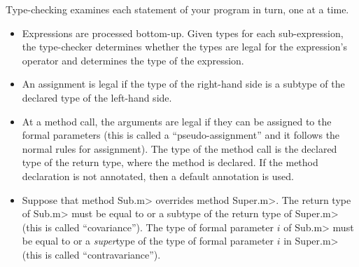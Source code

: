 Type-checking examines each statement of your program in turn, one at a time.
\begin{itemize}
\item
Expressions are processed bottom-up.  Given types for each sub-expression,
the type-checker determines whether the types are legal for the
expression's operator and determines the type of the expression.

\item
An assignment is legal if the type of the right-hand side is a subtype of
the declared type of the left-hand side.

\item
 At a method call, the arguments are legal if they can be assigned to the
 formal parameters (this is called a ``pseudo-assignment'' and it follows
 the normal rules for assignment).  The type of the method call is the
 declared type of the return type, where the method is declared.  If
 the method declaration is not annotated, then a default annotation is
 used.

\item
  Suppose that method \<Sub.m> overrides method \<Super.m>.
  The return type of \<Sub.m> must be equal to or a subtype of the return
  type of \<Super.m> (this is called ``covariance'').
  The type of formal parameter $i$ of \<Sub.m> must be equal to or a
  \emph{super}type of the type of formal parameter $i$ in \<Super.m> (this
  is called ``contravariance'').

\end{itemize}


